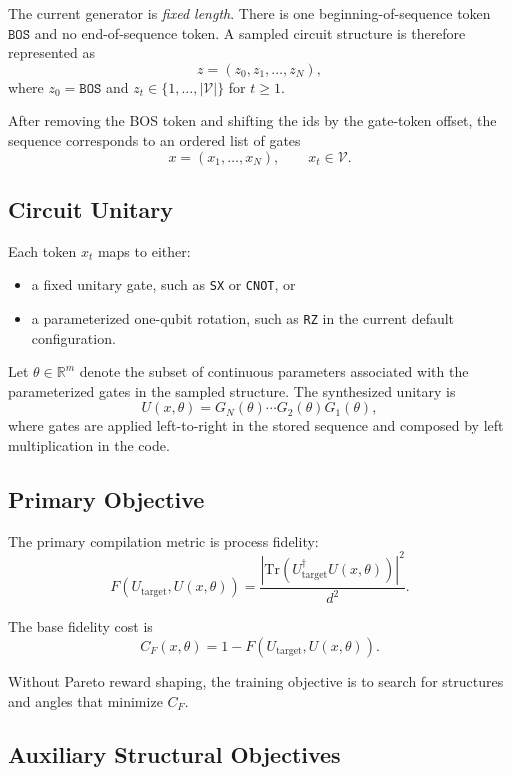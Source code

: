 \documentclass[11pt]{article}
\begin{document}
The current generator is \emph{fixed length}. There is one beginning-of-sequence token $\texttt{BOS}$ and no end-of-sequence token. A sampled circuit structure is therefore represented as
\[
z = (z_0,z_1,\dots,z_N),
\]
where $z_0 = \texttt{BOS}$ and $z_t \in \{1,\dots,|\mathcal{V}|\}$ for $t \ge 1$.

After removing the BOS token and shifting the ids by the gate-token offset, the sequence corresponds to an ordered list of gates
\[
x = (x_1,\dots,x_N), \qquad x_t \in \mathcal{V}.
\]

\subsection{Circuit Unitary}

Each token $x_t$ maps to either:
\begin{itemize}[leftmargin=*]
\item a fixed unitary gate, such as \texttt{SX} or \texttt{CNOT}, or
\item a parameterized one-qubit rotation, such as \texttt{RZ} in the current default configuration.
\end{itemize}

Let $\theta \in \mathbb{R}^m$ denote the subset of continuous parameters associated with the parameterized gates in the sampled structure. The synthesized unitary is
\[
U(x,\theta) = G_N(\theta)\cdots G_2(\theta)G_1(\theta),
\]
where gates are applied left-to-right in the stored sequence and composed by left multiplication in the code.

\subsection{Primary Objective}

The primary compilation metric is process fidelity:
\[
F\!\left(U_{\mathrm{target}},U(x,\theta)\right)
=
\frac{\left|\mathrm{Tr}\!\left(U_{\mathrm{target}}^\dagger U(x,\theta)\right)\right|^2}{d^2}.
\]

The base fidelity cost is
\[
C_F(x,\theta) = 1 - F\!\left(U_{\mathrm{target}},U(x,\theta)\right).
\]

Without Pareto reward shaping, the training objective is to search for structures and angles that minimize $C_F$.

\subsection{Auxiliary Structural Objectives}
\end{document}
